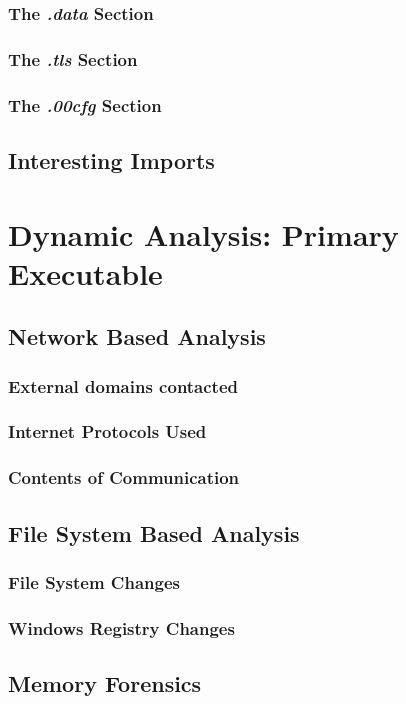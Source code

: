\documentclass[10pt,a4paper]{article}
\begin{document}
	\subsubsection{The \textit{.data} Section}
	\subsubsection{The \textit{.tls} Section}
	\subsubsection{The \textit{.00cfg} Section}

\subsection{Interesting Imports}

\section{Dynamic Analysis: Primary Executable}
		\subsection{Network Based Analysis}
			\subsubsection{External domains contacted}
			\subsubsection{Internet Protocols Used}
			\subsubsection{Contents of Communication}

		\subsection{File System Based Analysis}
				\subsubsection{File System Changes}
				\subsubsection{Windows Registry Changes}
		\subsection{Memory Forensics}
\end{document}
